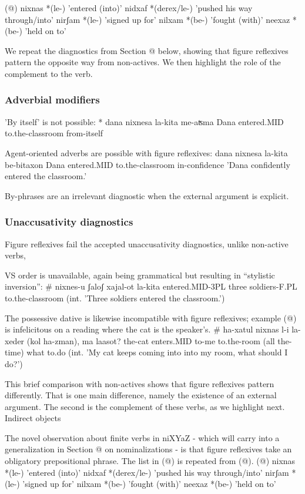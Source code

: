 (@)     nixnas  *(le-)  'entered (into)' 
        nidxaf  *(derex/le-)  'pushed his way through/into' 
        nirʃam  *(le-)  'signed up for' 
        nilxam  *(be-)  'fought (with)' 
        neexaz  *(be-)  'held on to' 
    
We repeat the diagnostics from Section @ below, showing that figure reflexives pattern the opposite way from non-actives. We then highlight the role of the complement to the verb.
		\subsubsection{Adverbial modifiers}
'By itself' is not possible:
     * dana nixnesa la-kita me-aʦma
         Dana entered.MID to.the-classroom from-itself

Agent-oriented adverbs are possible with figure reflexives:
         dana nixnesa la-kita be-bitaxon
         Dana entered.MID to.the-classroom in-confidence
         'Dana confidently entered the classroom.'

By-phrases are an irrelevant diagnostic when the external argument is explicit.


		\subsubsection{Unaccusativity diagnostics}

Figure reflexives fail the accepted unaccusativity diagnostics, unlike non-active verbs,

VS order is unavailable, again being grammatical but resulting in “stylistic inversion”:
 \# nixnes-u ʃaloʃ xajal-ot la-kita
         entered.MID-3PL three soldiers-F.PL to.the-classroom
         (int. 'Three soldiers entered the classroom.')

The possessive dative is likewise incompatible with figure reflexives; example (@) is infelicitous on a reading where the cat is the speaker's.
        \# ha-xatul nixnas l-i la-xeder (kol ha-zman), ma laasot?
         the-cat enters.MID to-me to.the-room (all the-time) what to.do
         (int. 'My cat keeps coming into into my room, what should I do?')

This brief comparison with non-actives shows that figure reflexives pattern differently. That is one main difference, namely the existence of an external argument. The second is the complement of these verbs, as we highlight next.
Indirect objects

The novel observation about finite verbs in niXYaZ - which will carry into a generalization in Section @ on nominalizations - is that figure reflexives take an obligatory prepositional phrase. The list in (@) is repeated from (@).
(@)     nixnas  *(le-)  'entered (into)' 
        nidxaf  *(derex/le-)  'pushed his way through/into' 
        nirʃam  *(le-)  'signed up for' 
        nilxam  *(be-)  'fought (with)' 
        neexaz  *(be-)  'held on to' 

